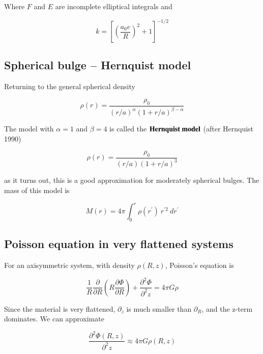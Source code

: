 Where $F$ and $E$ are incomplete elliptical integrals and 

\begin{equation}
k = \left[\left(\frac{a_0e}{R}\right)^2+1\right]^{-1/2} 
\end{equation}


\subsection{Spherical bulge -- Hernquist model}

Returning to the general spherical density 

\begin{equation}
\rho(r) = \frac{\rho_0}{(r/a)^\alpha (1+r/a)^{\beta-\alpha}}
\end{equation}


The model with $\alpha = 1$ and $\beta=4$ is called the ${\bf Hernquist \ model}$ (after Hernquist 1990)

\begin{equation}
\rho(r) = \frac{\rho_0}{(r/a) (1+r/a)^3}
\end{equation}

as it turns out, this is a good approximation for moderately spherical bulges. The mass of this model is 

\begin{equation}
M(r) =  4\pi \int_0^{r} \rho(r^\prime) \ r^{\prime 2} \ dr^\prime 
\end{equation}


\subsection{Poisson equation in very flattened systems}

For an axisymmetric system, with density $\rho(R,z)$, Poisson's equation is

\begin{equation}
\frac{1}{R}\frac{\partial}{\partial R} \left(R \frac{\partial\varPhi}{\partial R}\right) + \frac{\partial^2\varPhi}{\partial^2 z} = 4\pi G \rho
\end{equation}

Since the material is very flattened, $\partial_z$ is much smaller than $\partial_R$, and the z-term dominates. We can approximate


\begin{equation}
\frac{\partial^2\varPhi (R,z)}{\partial^2 z} \approx 4\pi G \rho(R,z)
\end{equation}

